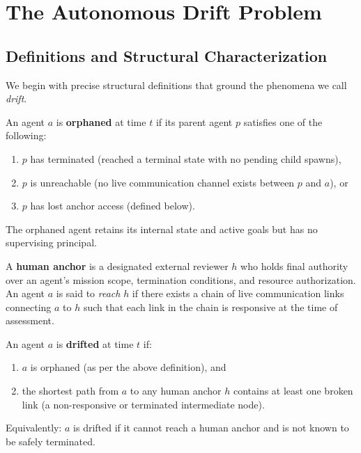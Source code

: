 \section{The Autonomous Drift Problem}

\subsection{Definitions and Structural Characterization}

We begin with precise structural definitions that ground the phenomena we call \emph{drift}.

\begin{definition}
An agent $a$ is \textbf{orphaned} at time $t$ if its parent agent $p$ satisfies one of the following:
\begin{enumerate}
    \item $p$ has terminated (reached a terminal state with no pending child spawns),
    \item $p$ is unreachable (no live communication channel exists between $p$ and $a$), or
    \item $p$ has lost anchor access (defined below).
\end{enumerate}
The orphaned agent retains its internal state and active goals but has no supervising principal.
\end{definition}

\begin{definition}
A \textbf{human anchor} is a designated external reviewer $h$ who holds final authority over an agent's mission scope, termination conditions, and resource authorization. An agent $a$ is said to \emph{reach} $h$ if there exists a chain of live communication links connecting $a$ to $h$ such that each link in the chain is responsive at the time of assessment.
\end{definition}

\begin{definition}
An agent $a$ is \textbf{drifted} at time $t$ if:
\begin{enumerate}
    \item $a$ is orphaned (as per the above definition), and
    \item the shortest path from $a$ to any human anchor $h$ contains at least one broken link (a non-responsive or terminated intermediate node).
\end{enumerate}
Equivalently: $a$ is drifted if it cannot reach a human anchor and is not known to be safely terminated.
\end{definition}

